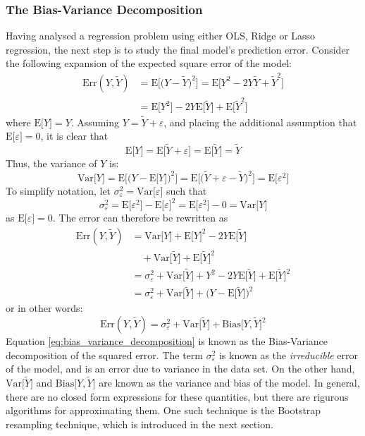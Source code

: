 \documentclass[nofootinbib,reprint,english]{revtex4-1}
\begin{document}
\subsubsection{The Bias-Variance Decomposition}
Having analysed a regression problem using either OLS, Ridge or Lasso regression, the next step is to study the final model's prediction error. Consider the following expansion of the expected square error of the model:
\begin{align*}
\text{Err}(Y,\tilde{Y})&=\text{E}\Big[\big(Y-\tilde{Y}\big)^2\Big]=\text{E}\Big[Y^2-2Y\tilde{Y}+\tilde{Y}^2\Big]\\
&=\text{E}\big[Y^2\big]-2Y\text{E}\big[\tilde{Y}\big]+\text{E}\big[\tilde{Y}^2\big]
\end{align*}
where \(\text{E}\big[Y\big]=Y\). Assuming \(Y=\tilde{Y}+\varepsilon\), and placing the additional assumption that \(\text{E}\big[\varepsilon\big]=0\), it is clear that
\[\text{E}\big[Y\big]=\text{E}\big[\tilde{Y}+\varepsilon\big]=\text{E}\big[\tilde{Y}\big]=\tilde{Y}\]
Thus, the variance of \(Y\) is:
\[\text{Var}\big[Y\big]=\text{E}\Big[\big(Y-\text{E}\big[Y\big]\big)^2\Big]=\text{E}\Big[\big(\tilde{Y}+\varepsilon-\tilde{Y}\big)^2\Big]=\text{E}\big[\varepsilon^2\big]\]
To simplify notation, let \(\sigma_\varepsilon^2=\text{Var}\big[\varepsilon\big]\) such that
\[\sigma_\varepsilon^2=\text{E}\big[\varepsilon^2\big]-\text{E}\big[\varepsilon\big]^2=\text{E}\big[\varepsilon^2\big]-0=\text{Var}\big[Y\big]\]
as \(\text{E}\big[\varepsilon\big]=0\). The error can therefore be rewritten as
\begin{align*}
\text{Err}(Y,\tilde{Y})&=\text{Var}\big[Y\big]+\text{E}\big[Y\big]^2-2Y\text{E}\big[\tilde{Y}\big]\\
&\quad+\text{Var}\big[\tilde{Y}\big]+\text{E}\big[\tilde{Y}\big]^2\\
&=\sigma_\varepsilon^2+\text{Var}\big[\tilde{Y}\big]+Y^2-2Y\text{E}\big[\tilde{Y}\big]+\text{E}\big[\tilde{Y}\big]^2\\
&=\sigma_\varepsilon^2+\text{Var}\big[\tilde{Y}\big]+\Big(Y-\text{E}\big[\tilde{Y}\big]\Big)^2
\end{align*}
or in other words:
\begin{equation}\label{eq:bias_variance_decomposition}
\text{Err}(Y,\tilde{Y})=\sigma_\varepsilon^2+\text{Var}\big[\tilde{Y}\big]+\text{Bias}\big[Y,\tilde{Y}\big]^2
\end{equation}
Equation \eqref{eq:bias_variance_decomposition} is known as the Bias-Variance decomposition of the squared error. The term \(\sigma_\varepsilon^2\) is known as the \emph{irreducible} error of the model, and is an error due to variance in the data set. On the other hand, \(\text{Var}\big[\tilde{Y}\big]\) and \(\text{Bias}\big[Y,\tilde{Y}\big]\) are known as the variance and bias of the model. In general, there are no closed form expressions for these quantities, but there are rigurous algorithms for approximating them. One such technique is the Bootstrap resampling technique, which is introduced in the next section.
\end{document}
